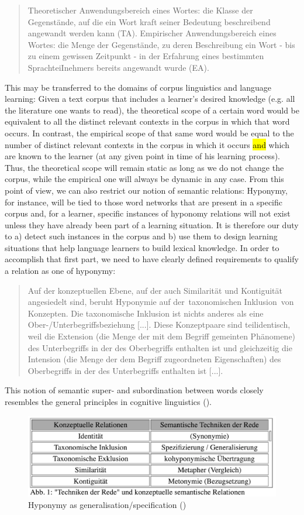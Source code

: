 \documentclass[jou]{apa6} %
\begin{document}
\blockquote[{\cite[p.~46]{coenenAnalogieUndMetapher2013}}]{Theoretischer Anwendungsbereich eines Wortes: die Klasse der Gegenstände, auf die ein Wort kraft seiner Bedeutung beschreibend angewandt werden kann (TA). Empirischer Anwendungsbereich eines Wortes: die Menge der Gegenstände, zu deren Beschreibung ein Wort - bis zu einem gewissen Zeitpunkt - in der Erfahrung eines bestimmten SprachteiInehmers bereits angewandt wurde (EA).}
This may be transferred to the domains of corpus linguistics and language learning: Given a text corpus that includes a learner's desired knowledge (e.g. all the literature one wants to read), the theoretical scope of a certain word would be equivalent to all the distinct relevant contexts in the corpus in which that word occurs. In contrast, the empirical scope of that same word would be equal to the number of distinct relevant contexts in the corpus in which it occurs \hl{and} which are known to the learner (at any given point in time of his learning process). Thus, the theoretical scope will remain static as long as we do not change the corpus, while the empirical one will always be dynamic in any case. From this point of view, we can also restrict our notion of semantic relations: Hyponymy, for instance, will be tied to those word networks that are present in a specific corpus and, for a learner, specific instances of hyponomy relations will not exist unless they have already been part of a learning situation. It is therefore our duty to a) detect such instances in the corpus and b) use them to design learning situations that help language learners to build lexical knowledge. In order to accomplish that first part, we need to have clearly defined requirements to qualify a relation as one of hyponymy:
\blockquote[{\cite[p.~16]{gevaudanSemantischeRelationenNominalen1999}}]{Auf der konzeptuellen Ebene, auf der auch Similarität und Kontiguität angesiedelt sind, beruht Hyponymie auf der taxonomischen Inklusion von Konzepten. Die taxonomische Inklusion ist nichts anderes als eine Ober-/Unterbegriffsbeziehung [...]. Diese Konzeptpaare sind teilidentisch, weil die Extension (die Menge der mit dem Begriff gemeinten Phänomene) des Unterbegriffs in der des Oberbegriffs enthalten ist und gleichzeitig die Intension (die Menge der dem Begriff zugeordneten Eigenschaften) des Oberbegriffs in der des Unterbegriffs enthalten ist [...].}
This notion of semantic super- and subordination between words closely resembles the general principles in cognitive linguistics (\cite[p.~5]{nerlichPolysemyFlexibilityIntroduction2003}).
\begin{figure}[ht]
\includegraphics[width=\linewidth]{hyponymy_generalization_specification}
\caption{Hyponymy as generalisation/specification (\cite[p.~18]{gevaudanSemantischeRelationenNominalen1999})}
\label{figure:hyponymyAsGeneralisation}
\end{figure}
\end{document}
